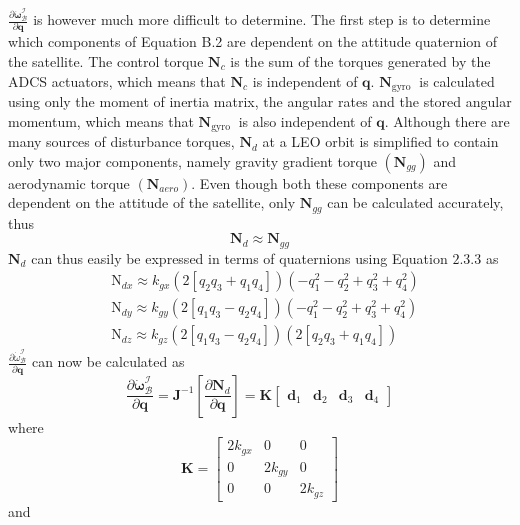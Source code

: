 $\frac{\partial \dot{\boldsymbol{\omega}}_{\mathcal{B}}^{\mathcal{I}}}{\partial \mathbf{q}}$ is however much more difficult to determine. The first step is to determine which components of Equation B.2 are dependent on the attitude quaternion of the satellite. The control torque $\mathbf{N}_{c}$ is the sum of the torques generated by the ADCS actuators, which means that $\mathbf{N}_{c}$ is independent of $\mathbf{q}$. $\mathbf{N}_{\text {gyro }}$ is calculated using only the moment of inertia matrix, the angular rates and the stored angular momentum, which means that $\mathbf{N}_{\text {gyro }}$ is also independent of $\mathbf{q}$. Although there are many sources of disturbance torques, $\mathbf{N}_{d}$ at a LEO orbit is simplified to contain only two major components, namely gravity gradient torque $\left(\mathbf{N}_{g g}\right)$ and aerodynamic torque $\left(\mathbf{N}_{a e r o}\right)$. Even though both these components are dependent on the attitude of the satellite, only $\mathbf{N}_{g g}$ can be calculated accurately, thus
$$
\mathbf{N}_{d} \approx \mathbf{N}_{g g}
$$
$\mathbf{N}_{d}$ can thus easily be expressed in terms of quaternions using Equation $2.3 .3$ as
$$
\begin{aligned}
&\mathrm{N}_{d x} \approx k_{g x}\left(2\left[q_{2} q_{3}+q_{1} q_{4}\right]\right)\left(-q_{1}^{2}-q_{2}^{2}+q_{3}^{2}+q_{4}^{2}\right) \\
&\mathrm{N}_{d y} \approx k_{g y}\left(2\left[q_{1} q_{3}-q_{2} q_{4}\right]\right)\left(-q_{1}^{2}-q_{2}^{2}+q_{3}^{2}+q_{4}^{2}\right) \\
&\mathrm{N}_{d z} \approx k_{g z}\left(2\left[q_{1} q_{3}-q_{2} q_{4}\right]\right)\left(2\left[q_{2} q_{3}+q_{1} q_{4}\right]\right)
\end{aligned}
$$
$\frac{\partial \dot{\omega}_{\mathcal{B}}^{\mathcal{I}}}{\partial \mathbf{q}}$ can now be calculated as
$$
\frac{\partial \dot{\boldsymbol{\omega}}_{\mathcal{B}}^{\mathcal{I}}}{\partial \mathbf{q}}=\mathbf{J}^{-1}\left[\frac{\partial \mathbf{N}_{d}}{\partial \mathbf{q}}\right]=\mathbf{K}\left[\begin{array}{llll}
\mathbf{d}_{1} & \mathbf{d}_{2} & \mathbf{d}_{3} & \mathbf{d}_{4}
\end{array}\right]
$$
where
$$
\mathbf{K}=\left[\begin{array}{ccc}
2 k_{g x} & 0 & 0 \\
0 & 2 k_{g y} & 0 \\
0 & 0 & 2 k_{g z}
\end{array}\right]
$$
and

